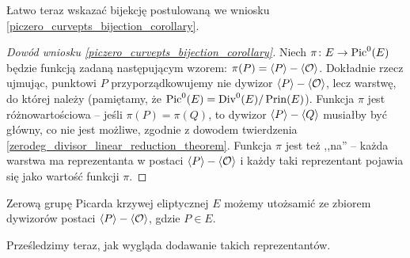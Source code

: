 Łatwo teraz wskazać bijekcję
postulowaną we wniosku \ref{piczero_curvepts_bijection_corollary}.

\begin{proof}[Dowód wniosku \ref{piczero_curvepts_bijection_corollary}]
Niech $\pi \colon E \to \operatorname{Pic}^0(E)$
będzie funkcją zadaną następującym wzorem:
$\pi(P) = \langle P\rangle - \langle\mathcal{O}\rangle$.
Dokładnie rzecz ujmując,
punktowi $P$ przyporządkowujemy nie dywizor $\langle P\rangle - \langle\mathcal{O}\rangle$,
lecz warstwę, do której należy
(pamiętamy, że $\operatorname{Pic}^0(E) = \operatorname{Div}^0(E)/\operatorname{Prin}(E)$).
Funkcja $\pi$ jest różnowartościowa --
jeśli $\pi(P) = \pi(Q)$,
to dywizor $\langle P\rangle - \langle Q\rangle$ musiałby być główny,
co nie jest możliwe,
zgodnie z dowodem twierdzenia \ref{zerodeg_divisor_linear_reduction_theorem}.
Funkcja $\pi$ jest też ,,na'' --
każda warstwa ma reprezentanta w postaci $\langle P\rangle - \langle\mathcal{O}\rangle$
i każdy taki reprezentant pojawia się jako wartość funkcji $\pi$.
\end{proof}

\begin{corollary}\label{piczero_representants_coro}
Zerową grupę Picarda krzywej eliptycznej $E$
możemy utożsamić ze zbiorem dywizorów postaci $\langle P\rangle - \langle\mathcal{O}\rangle$,
gdzie $P \in E$.
\end{corollary}

Prześledzimy teraz, jak wygląda dodawanie takich reprezentantów.

